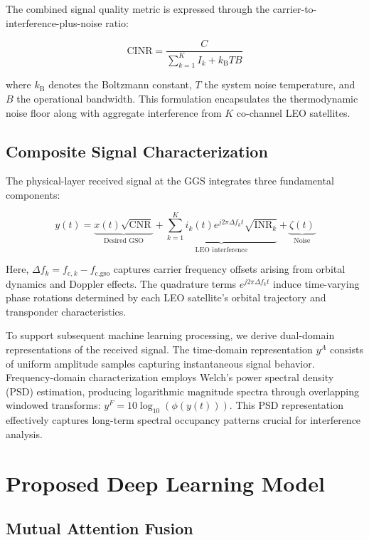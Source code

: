 \documentclass[10pt,twocolumn]{article}
\begin{document}
The combined signal quality metric is expressed through the carrier-to-interference-plus-noise ratio:

\begin{equation}
    \text{CINR} = \frac{C}{\sum_{k=1}^{K}I_k + k_{\text{B}}TB}
\end{equation}

where $k_{\text{B}}$ denotes the Boltzmann constant, $T$ the system noise temperature, and $B$ the operational bandwidth. This formulation encapsulates the thermodynamic noise floor along with aggregate interference from $K$ co-channel LEO satellites.

\subsection{Composite Signal Characterization}
The physical-layer received signal at the GGS integrates three fundamental components:

\begin{equation}
    y(t) = \underbrace{x(t)\sqrt{\text{CNR}}}_{\text{Desired GSO}} + \underbrace{\sum_{k=1}^{K} i_k(t)e^{j2\pi \Delta f_k t}\sqrt{\text{INR}_k}}_{\text{LEO interference}} + \underbrace{\zeta(t)}_{\text{Noise}}
\end{equation}

Here, $\Delta f_k = f_{\text{c},k} - f_{\text{c,gso}}$ captures carrier frequency offsets arising from orbital dynamics and Doppler effects. The quadrature terms $e^{j2\pi\Delta f_k t}$ induce time-varying phase rotations determined by each LEO satellite's orbital trajectory and transponder characteristics.

To support subsequent machine learning processing, we derive dual-domain representations of the received signal. The time-domain representation $y^A$ consists of uniform amplitude samples capturing instantaneous signal behavior. Frequency-domain characterization employs Welch's power spectral density (PSD) estimation, producing logarithmic magnitude spectra through overlapping windowed transforms: $y^F = 10\log_{10}(\phi(y(t)))$. This PSD representation effectively captures long-term spectral occupancy patterns crucial for interference analysis.


\section{Proposed Deep Learning Model}

\subsection{Mutual Attention Fusion}
\label{subsec:fusion}
\end{document}
